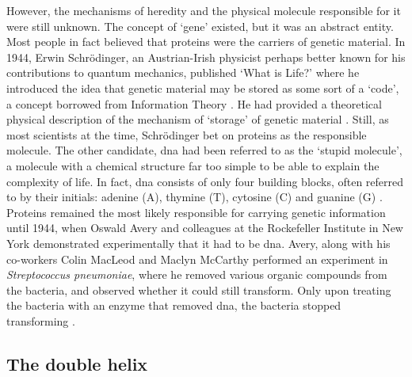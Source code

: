 However, the mechanisms of heredity and the physical molecule responsible for it were still unknown. 
The concept of `gene' existed, but it was an abstract entity. 
Most people in fact believed that proteins were the carriers of genetic material. 
In 1944, Erwin  Schrödinger, an Austrian-Irish physicist perhaps better known for his contributions to quantum mechanics, published `What is Life?' where he introduced the idea that genetic material may be stored as some sort of a `code', a concept borrowed from Information Theory \cite{schrodinger1944what}. 
He had provided a theoretical physical description of the mechanism of `storage' of genetic material \cite{mukherjee2016gene}.
Still, as most scientists at the time, Schrödinger bet on proteins as the responsible molecule. 
The other candidate, \gls{dna} had been referred to as the `stupid molecule', a molecule with a chemical structure far too simple to be able to explain the complexity of life. 
In fact, \gls{dna} consists of only four building blocks, often referred to by their initials: adenine (A), thymine (T), cytosine (C) and guanine (G) \cite{alberts2018molecular}.
Proteins remained the most likely responsible for carrying genetic information until 1944, when Oswald Avery and colleagues at the Rockefeller Institute in New York demonstrated experimentally that it had to be \gls{dna}. 
Avery, along with his co-workers Colin MacLeod and Maclyn McCarthy performed an experiment in \textit{Streptococcus pneumoniae}, where he removed various organic compounds from the bacteria, and observed whether it could still transform. 
Only upon treating the bacteria with an enzyme that removed \gls{dna}, the bacteria stopped transforming \cite{avery1944studies}.


\subsection{The double helix} %
\label{sec:double_helix}

